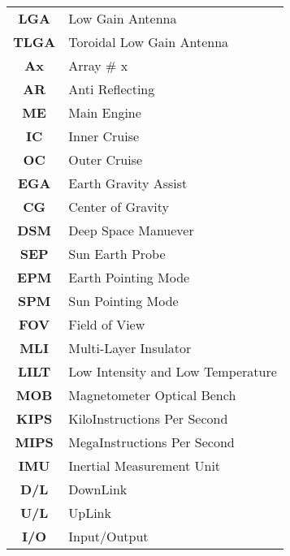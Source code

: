 \begin{multicols}{2}
{\begin{xltabular}{\linewidth}{c>{\raggedright\arraybackslash}X}
		\textbf{LGA} & Low Gain Antenna \\
		\textbf{TLGA} & Toroidal Low Gain Antenna \\
		\textbf{Ax} & Array \# x \\
		\textbf{AR} & Anti Reflecting\\
		\textbf{ME} & Main Engine \\
		\textbf{IC} & Inner Cruise \\
		\textbf{OC} & Outer Cruise \\
		\textbf{EGA} & Earth Gravity Assist\\
		\textbf{CG} & Center of Gravity \\
		\textbf{DSM} & Deep Space Manuever\\
		\textbf{SEP} & Sun Earth Probe \\
		\textbf{EPM} & Earth Pointing Mode \\
		\textbf{SPM} & Sun Pointing Mode \\
		\textbf{FOV} & Field of View \\
		\textbf{MLI} & Multi-Layer Insulator \\
		\textbf{LILT} & Low Intensity and Low Temperature \\
		\textbf{MOB} & Magnetometer Optical Bench \\
		\textbf{KIPS} & KiloInstructions Per Second \\
		\textbf{MIPS} & MegaInstructions Per Second \\
		\textbf{IMU} & Inertial Measurement Unit \\
		\textbf{D/L} & DownLink \\
		\textbf{U/L} & UpLink \\
		\textbf{I/O} & Input/Output
 	\end{xltabular}
	\unskip
	\unpenalty
	\unpenalty}
	\unvbox\ltmcbox
\end{multicols}